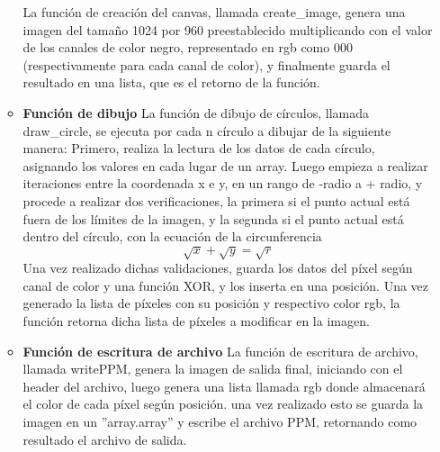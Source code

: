 \documentclass[12pt, letterpaper]{article}
\begin{document}
\begin{flushleft}
\begin{enumerate}
\begin{itemize}
            La función de creación del canvas, llamada create\_image, genera una imagen del tamaño 1024 por 960 preestablecido multiplicando con el valor de los canales de color negro, representado en rgb como 000 (respectivamente para cada canal de color), y finalmente guarda el resultado en una lista, que es el retorno de la función.
            \item \textbf{Función de dibujo}
            La función de dibujo de círculos, llamada draw\_circle, se ejecuta por cada n círculo a dibujar de la siguiente manera: Primero, realiza la lectura de los datos de cada círculo, asignando los valores en cada lugar de un array. Luego empieza a realizar iteraciones entre la coordenada x e y, en un rango de -radio a + radio, y procede a realizar dos verificaciones, la primera si el punto actual está fuera de los límites de la imagen, y la segunda si el punto actual está dentro del círculo, con la ecuación de la circunferencia \begin{equation}\sqrt{x} + \sqrt{y} = \sqrt{r}\end{equation} Una vez realizado dichas validaciones, guarda los datos del píxel según canal de color y una función XOR, y los inserta en una posición. Una vez generado la lista de píxeles con su posición y respectivo color rgb, la función retorna dicha lista de píxeles a modificar en la imagen.
            \item \textbf{Función de escritura de archivo}
            La función de escritura de archivo, llamada writePPM, genera la imagen de salida final, iniciando con el header del archivo, luego genera una lista llamada rgb donde almacenará el color de cada píxel según posición. una vez realizado esto se guarda la imagen en un ''array.array'' y escribe el archivo PPM, retornando como resultado el archivo de salida.
        \end{itemize}


\end{enumerate}
\end{flushleft}
\end{document}

